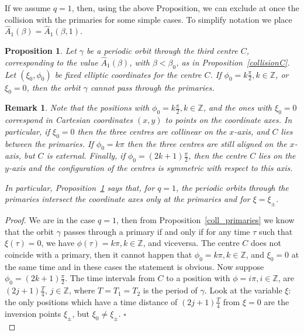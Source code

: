 \documentclass[a4paper]{article}
\newtheorem{proposition}{Proposition}
\newtheorem{remark}{Remark}
\begin{document}
If we assume $q=1$, then, using the above Proposition, we can exclude
at once the collision with the primaries for some simple cases.  To
simplify notation we place $\hat{A}_1(\beta)=\hat{A}_1(\beta,1)$.
\begin{proposition}
  \label{first_exceptions}
  Let $\gamma$ be a periodic orbit through the third centre $C$,
  corresponding to the value $\hat{A}_1(\beta)$, with $\beta<\beta_0$,
  as in Proposition~\ref{collisionC}. Let $(\xi_0,\phi_0)$ be fixed
  elliptic coordinates for the centre $C$. If $\phi_0=k\frac{\pi}{2},
  k \in {\mathbb{Z}}$, or $\xi_0=0$, then the orbit $\gamma$ cannot pass through
  the primaries.
\end{proposition}
\begin{remark}
  Note that the positions with $\phi_0=k\frac{\pi}{2}, k \in {\mathbb{Z}}$, and
  the ones with $\xi_0=0$ correspond in Cartesian coordinates $(x,y)$
  to points on the coordinate axes. In particular, if $\xi_0=0$ then
  the three centres are collinear on the $x$-axis, and $C$ lies
  between the primaries.  If $\phi_0=k\pi$ then the three centres are
  still aligned on the $x$-axis, but $C$ is external. Finally, if
  $\phi_0=(2k+1)\frac{\pi}{2}$, then the centre $C$ lies on the
  $y$-axis and the configuration of the centres is symmetric with
  respect to this axis.
  
  In particular, Proposition~\ref{first_exceptions} says that, for $q
  = 1$, the periodic orbits through the primaries intersect the
  coordinate axes only at the primaries and for $\xi=\xi_{\pm}$.
\end{remark}
\begin{proof} 
We are in the case $q=1$, then from Proposition~\ref{coll_primaries}
we know that the orbit $\gamma$ passes through a primary if and only
if for any time $\tau$ such that $\xi(\tau)=0$, we have
$\phi(\tau)=k\pi, k \in {\mathbb{Z}}$, and viceversa.  The centre $C$ does not
coincide with a primary, then it cannot happen that $\phi_0=k\pi, k\in
{\mathbb{Z}}$, and $\xi_0=0$ at the same time and in these cases the statement
is obvious.  Now suppose $\phi_0=(2k+1)\frac{\pi}{2}$.  The time
intervals from $C$ to a position with $\phi=i\pi, i \in {\mathbb{Z}}$, are
$(2j+1)\frac{T}{4}$, $j \in {\mathbb{Z}}$, where $T=T_1=T_2$ is the period of
$\gamma$. Look at the variable $\xi$: the only positions which have a
time distance of $(2j+1)\frac{T}{4}$ from $\xi=0$ are the inversion
points $\xi_{\pm}$, but $\xi_0\neq\xi_{\pm}$.
{$\square$\\}
\end{proof}
\end{document}
